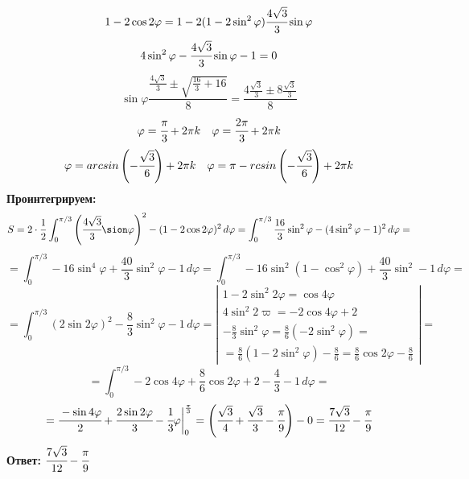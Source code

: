 $$1 - 2 \cos 2\varphi = 1-2(1-2\sin^2 \varphi)\cfrac{4 \sqrt{3}}{3} \sin \varphi$$
$$4\sin^2 \varphi - \cfrac{4 \sqrt{3}}{3} \sin \varphi -1 = 0$$
$$\sin \varphi \frac{\frac{4\sqrt{3}}{3} \pm \sqrt{\frac{16}{3} + 16}}{8} =  \frac{4 \frac{\sqrt{3}}{3} \pm 8 \frac{\sqrt{3}}{3}}{8}$$
$$\varphi = \cfrac{\pi}{3} + 2\pi k \quad \varphi = \cfrac{2\pi}{3} + 2\pi k$$
$$\varphi = arcsin \left( - \cfrac{\sqrt{3}}{6}\right) + 2\pi k \quad \varphi = \pi - rcsin \left( - \cfrac{\sqrt{3}}{6}\right) + 2\pi k$$
\textbf{Проинтегрируем:}
$$S = 2 \cdot \frac{1}{2} \int_0^{\pi/3}\left( \cfrac{4 \sqrt{3}}{3} \sion \varphi \right)^2 - (1-2\cos 2\varphi)^2 \, d \varphi = \int_0^{\pi/3} \frac{16}{3} \sin^2 \varphi - (4 \sin^2 \varphi -1)^2 \, d \varphi =$$
$$ = \int_0^{\pi/3} -16 \sin^4 \varphi + \frac{40}{3} \sin^2 \varphi -1 \, d \varphi =  \int_0^{\pi/3} -16 \sin^2(1 - \cos ^2 \varphi) + \frac{40}{3} \sin^2 - 1 \, d \varphi =$$
$$=  \int_0^{\pi/3} (2 \sin 2\varphi)^2 - \frac{8}{3} \sin^2 \varphi -1 \, d \varphi = \left |
\begin{array}{c}
     1-2\sin^2 2\varphi = \cos 4 \varphi\\
     4 \sin^2 2\varpi = -2 \cos 4 \varphi + 2 \\
     -\frac{8}{3} \sin^2 \varphi = \frac{8}{6} (-2 \sin^2 \varphi) = \\ = \frac{8}{6}(1 - 2 \sin^2 \varphi) - \frac{8}{6}  =\frac{8}{6} \cos 2 \varphi - \frac{8}{6}
\end{array} 
\right| =
$$
$$
 =\int_0^{\pi/3}-2\cos 4 \varphi + \frac{8}{6} \cos 2 \varphi + 2 - \frac{4}{3} - 1 \, d \varphi = 
$$
$$
= \cfrac{- \sin 4 \varphi}{2} + \cfrac{2 \sin 2 \varphi}{3} - \cfrac{1}{3}\varphi \biggr | ^{\frac{\pi}{3}}_0 = \left( \cfrac{\sqrt{3}}{4} + \cfrac{\sqrt{3}}{3} - \cfrac{\pi}{9} \right) - 0 = \cfrac{7 \sqrt{3}}{12} - \cfrac{\pi}{9}
$$
\textbf{Ответ:} $\cfrac{7 \sqrt{3}}{12} - \cfrac{\pi}{9}$

